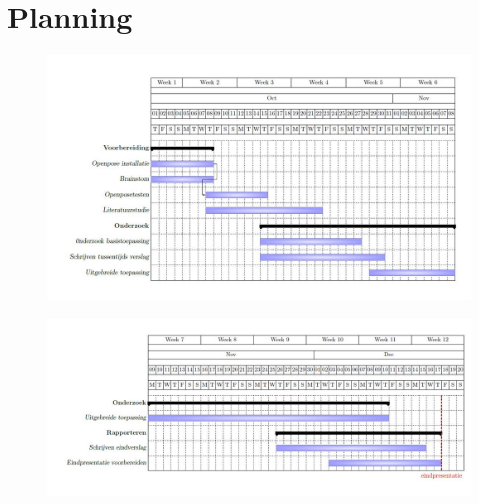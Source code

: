 \documentclass[a4paper,twoside,kulak]{kulakreport}
\begin{document}
\chapter{Planning}

\begin{landscape}
	\begin{figure}
		\includegraphics[width= 2\textwidth]{ganttchart_1}
	\end{figure}
	\begin{figure}
		\includegraphics[width= 2\textwidth]{ganttchart_2}
	\end{figure}
\end{landscape}







\end{document}
